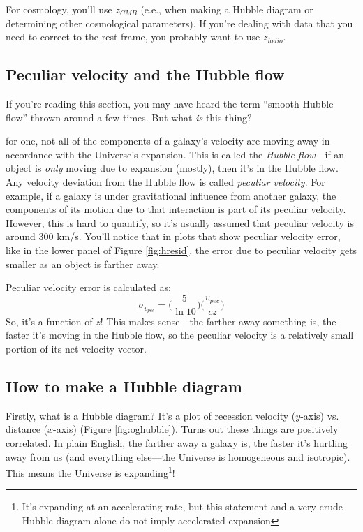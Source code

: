 For cosmology, you'll use $z_{CMB}$ (e.e., when making a Hubble diagram or determining other cosmological parameters). If you're dealing with data that you need to correct to the rest frame, you probably want to use $z_{helio}$.

\subsection{Peculiar velocity and the Hubble flow}
\label{sec:vpec}
If you're reading this section, you may have heard the term ``smooth Hubble flow'' thrown around a few times. But what \textit{is} this thing?

for one, not all of the components of a galaxy's velocity are moving away in accordance with the Universe's expansion. This is called the \textit{Hubble flow}---if an object is \textit{only} moving due to expansion (mostly), then it's in the Hubble flow. Any velocity deviation from the Hubble flow is called \textit{peculiar velocity}. For example, if a galaxy is under gravitational influence from another galaxy, the components of its motion due to that interaction is part of its peculiar velocity. However, this is hard to quantify, so it's usually assumed that peculiar velocity is around 300 km/s. You'll notice that in plots that show peculiar velocity error, like in the lower panel of Figure \ref{fig:hresid}, the error due to peculiar velocity gets smaller as an object is farther away. 

Peculiar velocity error is calculated as:
\begin{equation}
\label{eqn:evpec}
    \sigma_{v_{pec}} = \Big( \frac{5}{\ln 10} \Big) \Big( \frac{v_{pec}}{cz} \Big)
\end{equation}
So, it's a function of $z$! This makes sense---the farther away something is, the faster it's moving in the Hubble flow, so the peculiar velocity is a relatively small portion of its net velocity vector. 

\subsection{How to make a Hubble diagram}
Firstly, what is a Hubble diagram? It's a plot of recession velocity ($y$-axis) vs. distance ($x$-axis) (Figure \ref{fig:oghubble}). Turns out these things are positively correlated. In plain English, the farther away a galaxy is, the faster it's hurtling away from us (and everything else---the Universe is homogeneous and isotropic). This means the Universe is expanding\footnote{It's expanding at an accelerating rate, but this statement and a very crude Hubble diagram alone do not imply accelerated expansion}!

